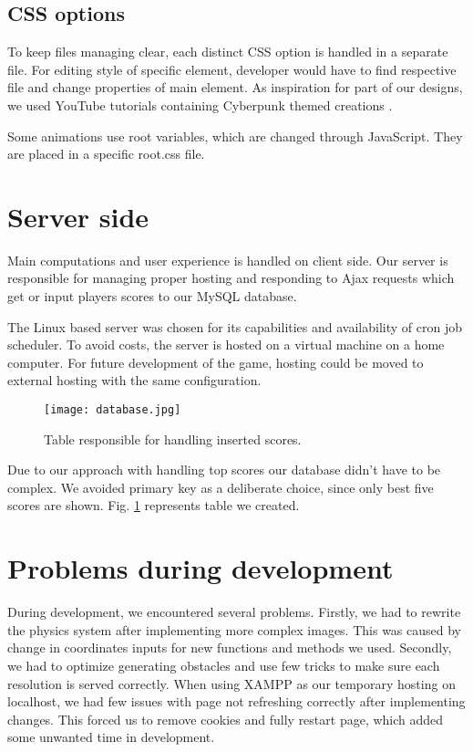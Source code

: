\documentclass[oneside,a4paper,11pt]{report}
\begin{document}
\subsection{CSS options}
To keep files managing clear, each distinct CSS option is handled in a separate file. For editing style of specific element, developer would have to find respective file and change properties of main element. As inspiration for part of our designs, we used YouTube tutorials containing Cyberpunk themed creations \cite{CyberpunkCSS} \cite{GlitchCSS}.

\par
Some animations use root variables, which are changed through JavaScript. They are placed in a specific root.css file.

\section{Server side}
Main computations and user experience is handled on client side. Our server is responsible for managing proper hosting and responding to Ajax requests which get or input players scores to our MySQL database.

\par
The Linux based server was chosen for its capabilities and availability of cron job scheduler. To avoid costs, the server is hosted on a virtual machine on a home computer. For future development of the game, hosting could be moved to external hosting with the same configuration.

\begin{figure}[!htb]
	\centering
	\texttt{[image: database.jpg]}
	\caption{Table responsible for handling inserted scores.\label{fig:database}}
\end{figure}

\par
Due to our approach with handling top scores our database didn’t have to be complex. We avoided primary key as a deliberate choice, since only best five scores are shown. Fig. \ref{fig:database} represents table we created.



\section{Problems during development}
During development, we encountered several problems. Firstly, we had to rewrite the physics system after implementing more complex images. This was caused by change in coordinates inputs for new functions and methods we used. Secondly, we had to optimize generating obstacles and use few tricks to make sure each resolution is served correctly. When using XAMPP as our temporary hosting on localhost, we had few issues with page not refreshing correctly after implementing changes. This forced us to remove cookies and fully restart page, which added some unwanted time in development.
\end{document}
